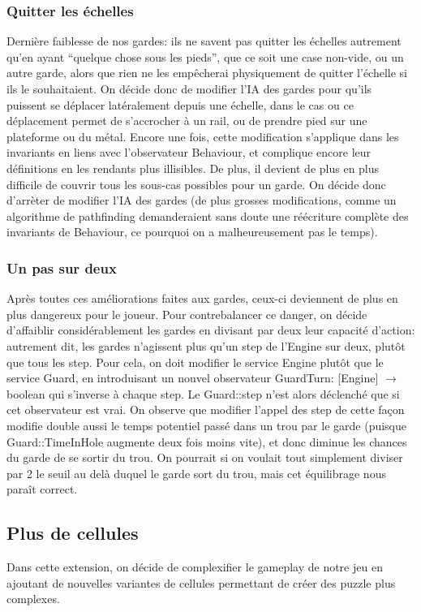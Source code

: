 \documentclass{article}
\begin{document}
\subsubsection{Quitter les échelles}
Dernière faiblesse de nos gardes: ils ne savent pas quitter les échelles autrement qu'en ayant ``quelque chose sous les pieds'', que ce soit une case non-vide, ou un autre garde, alors que rien ne les empêcherai physiquement de quitter l'échelle si ils le souhaitaient. On décide donc de modifier l'IA des gardes pour qu'ils puissent se déplacer latéralement depuis une échelle, dans le cas ou ce déplacement permet de s'accrocher à un rail, ou de prendre pied sur une plateforme ou du métal. Encore une fois, cette modification s'applique dans les invariants en liens avec l'observateur \textrm{Behaviour}, et complique encore leur définitions en les rendants plus illisibles. De plus, il devient de plus en plus difficile de couvrir tous les sous-cas possibles pour un garde. On décide donc d'arrèter de modifier l'IA des gardes (de plus grosses modifications, comme un algorithme de pathfinding demanderaient sans doute une réécriture complète des invariants de \textrm{Behaviour}, ce pourquoi on a malheureusement pas le temps).

\subsubsection{Un pas sur deux}
Après toutes ces améliorations faites aux gardes, ceux-ci deviennent de plus en plus dangereux pour le joueur. Pour contrebalancer ce danger, on décide d'affaiblir considérablement les gardes en divisant par deux leur capacité d'action: autrement dit, les gardes n'agissent plus qu'un \textrm{step} de l'\textrm{Engine} sur deux, plutôt que tous les \textrm{step}. Pour cela, on doit modifier le service \textrm{Engine} plutôt que le service \textrm{Guard}, en introduisant un nouvel observateur \textrm{GuardTurn: [Engine] $\rightarrow$ boolean} qui s'inverse à chaque \textrm{step}. Le \textrm{Guard::step} n'est alors déclenché que si cet observateur est vrai. On observe que modifier l'appel des \textrm{step} de cette façon modifie double aussi le temps potentiel passé dans un trou par le garde (puisque \textrm{Guard::TimeInHole} augmente deux fois moins vite), et donc diminue les chances du garde de se sortir du trou. On pourrait si on voulait tout simplement diviser par 2 le seuil au delà duquel le garde sort du trou, mais cet équilibrage nous paraît correct.

\subsection{Plus de cellules}
Dans cette extension, on décide de complexifier le gameplay de notre jeu en ajoutant de nouvelles variantes de cellules permettant de créer des puzzle plus complexes.
\end{document}
